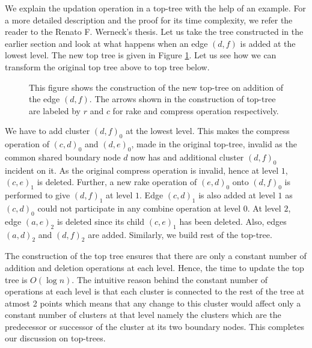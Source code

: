 \documentclass[a4paper,12pt]{article}
\begin{document}
We explain the updation operation in a top-tree with the help of an example. For a more detailed description and the proof for its time complexity, we refer the reader to the Renato F. Werneck's thesis\cite{werneck}. Let us take the tree constructed in the earlier section and look at what happens when an edge $(d,f)$ is added at the lowest level. The new top tree is given in Figure \ref{fig:top-tree-updation}. Let us see how we can transform the original top tree above to top tree below.

\begin{figure}
\caption{This figure shows the construction of the new top-tree on addition of the edge $(d,f)$. The arrows shown in the construction of top-tree are labeled by $r$ and $c$ for rake and compress operation respectively.}
\label{fig:top-tree-updation}
\end{figure}

We have to add cluster $(d,f)_0$ at the lowest level. This makes the compress operation of $(c,d)_{0}$ and $(d,e)_{0}$, made in the original top-tree, invalid as the common shared boundary node $d$ now has and additional cluster $(d,f)_{0}$ incident on it. As the original compress operation is invalid, hence at level $1$, $(c,e)_1$ is deleted. Further, a new rake operation of $(e,d)_{0}$ onto $(d,f)_{0}$ is performed to give $(d,f)_{1}$ at level $1$. Edge $(c,d)_1$ is also added at level $1$ as $(c,d)_{0}$ could not participate in any combine operation at level $0$. At level $2$, edge $(a,e)_2$ is deleted since its child $(c,e)_1$ has been deleted. Also, edges $(a,d)_2$ and $(d,f)_2$ are added. Similarly, we build rest of the top-tree.

The construction of the top tree ensures that there are only a constant number of addition and deletion operations at each level. Hence, the time to update the top tree is $O(\log n)$. The intuitive reason behind the constant number of operations at each level is that each cluster is connected to the rest of the tree at atmost 2 points which means that any change to this cluster would affect only a constant number of clusters at that level namely the clusters which are the predecessor or successor of the cluster at its two boundary nodes. This completes our discussion on top-trees.
\end{document}
